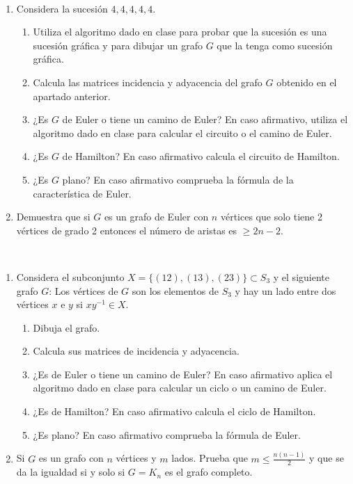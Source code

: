 \begin{ejercicio}\label{ej:1.28}~
    \begin{enumerate}
        \item Considera la sucesión $4,4,4,4,4$.
        \begin{enumerate}
            \item Utiliza el algoritmo dado en clase para probar que la sucesión es una sucesión gráfica y para dibujar un grafo $G$ que la tenga como sucesión gráfica.
            \item Calcula las matrices incidencia y adyacencia del grafo $G$ obtenido en el apartado anterior.
            \item ¿Es $G$ de Euler o tiene un camino de Euler? En caso afirmativo, utiliza el algoritmo dado en clase para calcular el circuito o el camino de Euler.
            \item ¿Es $G$ de Hamilton? En caso afirmativo calcula el circuito de Hamilton.
            \item ¿Es $G$ plano? En caso afirmativo comprueba la fórmula de la característica de Euler.
        \end{enumerate}
        \item Demuestra que si $G$ es un grafo de Euler con $n$ vértices que solo tiene 2 vértices de grado 2 entonces el número de aristas es $\geq 2n - 2$.
    \end{enumerate}
\end{ejercicio}

\begin{ejercicio}\label{ej:1.29}~
    \begin{enumerate}
        \item Considera el subconjunto $X = \{(12),(13),(23)\} \subset S_3$ y el siguiente grafo $G$: Los vértices de $G$ son los elementos de $S_3$ y hay un lado entre dos vértices $x$ e $y$ si $xy^{-1} \in X$.
        \begin{enumerate}
            \item Dibuja el grafo.
            \item Calcula sus matrices de incidencia y adyacencia.
            \item ¿Es de Euler o tiene un camino de Euler? En caso afirmativo aplica el algoritmo dado en clase para calcular un ciclo o un camino de Euler.
            \item ¿Es de Hamilton? En caso afirmativo calcula el ciclo de Hamilton.
            \item ¿Es plano? En caso afirmativo comprueba la fórmula de Euler.
        \end{enumerate}
        \item Si $G$ es un grafo con $n$ vértices y $m$ lados. Prueba que $m \leq \frac{n(n-1)}{2}$ y que se da la igualdad si y solo si $G = K_n$ es el grafo completo.
    \end{enumerate}
\end{ejercicio}

